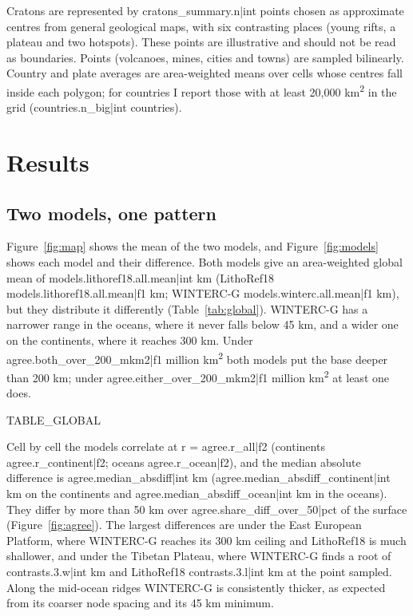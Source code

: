 \documentclass[11pt,a4paper]{article}
\begin{document}
Cratons are represented by {{cratons_summary.n|int}} points chosen as approximate centres from general geological maps, with six contrasting places (young rifts, a plateau and two hotspots). These points are illustrative and should not be read as boundaries. Points (volcanoes, mines, cities and towns) are sampled bilinearly. Country and plate averages are area-weighted means over cells whose centres fall inside each polygon; for countries I report those with at least 20,000 km\textsuperscript{2} in the grid ({{countries.n_big|int}} countries).

\section{Results}

\subsection{Two models, one pattern}

Figure~\ref{fig:map} shows the mean of the two models, and Figure~\ref{fig:models} shows each model and their difference. Both models give an area-weighted global mean of {{models.lithoref18.all.mean|int}} km (LithoRef18 {{models.lithoref18.all.mean|f1}} km; WINTERC-G {{models.winterc.all.mean|f1}} km), but they distribute it differently (Table~\ref{tab:global}). WINTERC-G has a narrower range in the oceans, where it never falls below 45 km, and a wider one on the continents, where it reaches 300 km. Under {{agree.both_over_200_mkm2|f1}} million km\textsuperscript{2} both models put the base deeper than 200 km; under {{agree.either_over_200_mkm2|f1}} million km\textsuperscript{2} at least one does.

{{TABLE_GLOBAL}}

Cell by cell the models correlate at r = {{agree.r_all|f2}} (continents {{agree.r_continent|f2}}; oceans {{agree.r_ocean|f2}}), and the median absolute difference is {{agree.median_absdiff|int}} km ({{agree.median_absdiff_continent|int}} km on the continents and {{agree.median_absdiff_ocean|int}} km in the oceans). They differ by more than 50 km over {{agree.share_diff_over_50|pct}} of the surface (Figure~\ref{fig:agree}). The largest differences are under the East European Platform, where WINTERC-G reaches its 300 km ceiling and LithoRef18 is much shallower, and under the Tibetan Plateau, where WINTERC-G finds a root of {{contrasts.3.w|int}} km and LithoRef18 {{contrasts.3.l|int}} km at the point sampled. Along the mid-ocean ridges WINTERC-G is consistently thicker, as expected from its coarser node spacing and its 45 km minimum.
\end{document}
